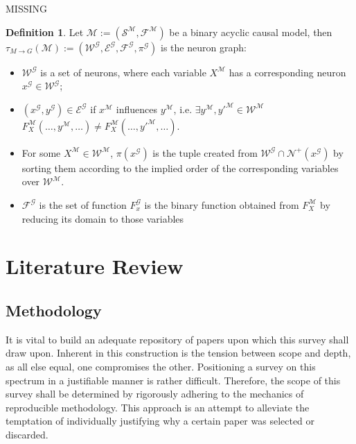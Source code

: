 \documentclass[11pt,a4paper]{book}
\theoremstyle{definition}
\newtheorem{definition}{Definition}[section]
\theoremstyle{definition}
\theoremstyle{definition}
\theoremstyle{remark}
\newcommand{\gtpred}{\mathcal{N}^+}
\newcommand{\ngraph}{\mathcal{G}}
\newcommand{\cmodel}{\mathcal{M}}
\newcommand{\csig}{\mathcal{S}}
\newcommand{\cfoos}{\mathcal{F}}
\newcommand{\cvars}{\mathcal{W}}
\newcommand{\crel}{\mathcal{E}}
\begin{document}
MISSING
\begin{definition}
Let $\cmodel:=(\csig^{\cmodel}, \cfoos^{\cmodel})$ be a binary acyclic causal model, then $\tau_{M\to G}(\cmodel):=(\cvars^{\ngraph}, \crel^{\ngraph}, \cfoos^{\ngraph}, \pi^{\ngraph})$ is the neuron graph:
\begin{itemize}
\item $\cvars^{\ngraph} $ is a set of neurons, where each variable $X^{\cmodel}$ has a corresponding neuron  $x^{\ngraph} \in \cvars^{\ngraph} $;
\item  $(x^{\ngraph}, y^{\ngraph}) \in \crel^{\ngraph}$ if $x^{\cmodel}$ influences $y^{\cmodel}$, i.e. $\exists y^{\cmodel},y'^{\cmodel} \in \cvars^{\cmodel}$ \\
$F_{X}^{\cmodel}(\dots , y^{\cmodel}, \dots ) \neq F_{X}^{\cmodel}(\dots , y'^{\cmodel}, \dots)$.
\item For some $X^{\cmodel} \in \cvars^{\cmodel}$,  $\pi(x^{\ngraph})$ is the tuple created from $\cvars^{\ngraph} \cap \gtpred(x^{\ngraph})$ by sorting them according to the implied order of the corresponding variables over $\cvars^{\cmodel}$.
\item $\cfoos^{\ngraph}$ is the set of function $F_x^{\ngraph}$ is the binary function obtained from $F_X^{\cmodel}$ by reducing its domain to those variables 
\end{itemize}
\end{definition}


\chapter{Literature Review}

\section{Methodology}
\label{sec:methodology}

It is vital to build an adequate repository of papers upon which this survey shall draw upon. Inherent in this construction is the tension between scope and depth, as all else equal, one compromises the other. Positioning a survey on this spectrum in a justifiable manner is rather difficult. Therefore, the scope of this survey shall be determined by rigorously adhering to the mechanics of reproducible methodology. This approach is an attempt to alleviate the temptation of individually justifying why a certain paper was selected or discarded. 
\end{document}
